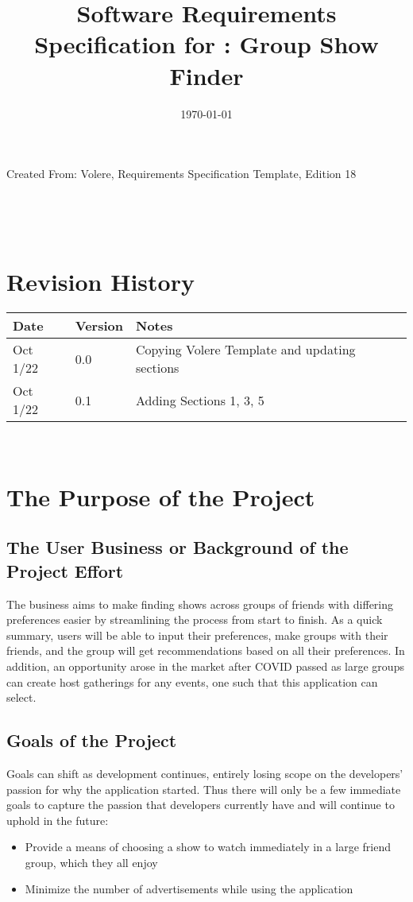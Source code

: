 \documentclass[12pt]{article}
\begin{document}
\title{Software Requirements Specification for \progname: Group Show Finder} 
\author{\authname}
\date{\today}
	
\maketitle
\vspace*{\fill}
Created From: Volere, Requirements Specification Template, Edition 18


~\newpage {}

\tableofcontents

~\newpage

\section*{Revision History}

\begin{tabularx}{\textwidth}{p{3cm}p{2cm}X}
\toprule {\bf Date} & {\bf Version} & {\bf Notes}\\
\midrule
Oct 1/22 & 0.0 & Copying Volere Template and updating sections\\
Oct 1/22 & 0.1 & Adding Sections 1, 3, 5\\

\bottomrule
\end{tabularx}

~\newpage {}

\section{The Purpose of the Project}

\subsection{The User Business or Background of the Project Effort}
The business aims to make finding shows across groups of friends with differing preferences easier by streamlining the process from start to finish. As a quick summary, users will be able to input their preferences, make groups with their friends, and the group will get recommendations based on all their preferences. In addition, an opportunity arose in the market after COVID passed as large groups can create host gatherings for any events, one such that this application can select.

\subsection{Goals of the Project}
Goals can shift as development continues, entirely losing scope on the developers' passion for why the application started. Thus there will only be a few immediate goals to capture the passion that developers currently have and will continue to uphold in the future:
\begin{itemize}
	\item Provide a means of choosing a show to watch immediately in a large friend group, which they all enjoy
	\item Minimize the number of advertisements while using the application
\end{itemize}
\end{document}
